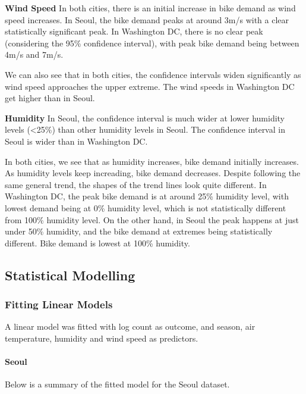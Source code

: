 \documentclass[]{article}
\let\oldparagraph\paragraph
\renewcommand{\paragraph}[1]{\oldparagraph{#1}\mbox{}}
\begin{document}
\textbf{Wind Speed} In both cities, there is an initial increase in bike
demand as wind speed increases. In Seoul, the bike demand peaks at
around 3m/s with a clear statistically significant peak. In Washington
DC, there is no clear peak (considering the 95\% confidence interval),
with peak bike demand being between 4m/s and 7m/s.

We can also see that in both cities, the confidence intervals widen
significantly as wind speed approaches the upper extreme. The wind
speeds in Washington DC get higher than in Seoul.

\textbf{Humidity} In Seoul, the confidence interval is much wider at
lower humidity levels (\textless25\%) than other humidity levels in
Seoul. The confidence interval in Seoul is wider than in Washington DC.

In both cities, we see that as humidity increases, bike demand initially
increases. As humidity levels keep increading, bike demand decreases.
Despite following the same general trend, the shapes of the trend lines
look quite different. In Washington DC, the peak bike demand is at
around 25\% humidity level, with lowest demand being at 0\% humidity
level, which is not statistically different from 100\% humidity level.
On the other hand, in Seoul the peak happens at just under 50\%
humidity, and the bike demand at extremes being statistically different.
Bike demand is lowest at 100\% humidity.

\hypertarget{statistical-modelling}{%
\subsection{Statistical Modelling}\label{statistical-modelling}}

\hypertarget{fitting-linear-models}{%
\subsubsection{Fitting Linear Models}\label{fitting-linear-models}}

A linear model was fitted with log count as outcome, and season, air
temperature, humidity and wind speed as predictors.

\hypertarget{seoul}{%
\paragraph{Seoul}\label{seoul}}

Below is a summary of the fitted model for the Seoul dataset.
\end{document}

